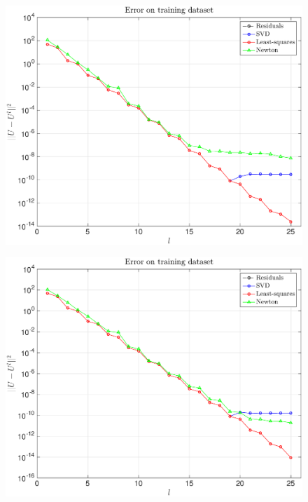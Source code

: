 \documentclass[11pt,a4paper]{article}
\theoremstyle{definition}
\theoremstyle{theorem}
\numberwithin{equation}{section}
\begin{document}
	\begin{figure}[H]
		\center
		\includegraphics[scale = 0.5]{fig18}
		\caption{}
	\end{figure}
	
	\begin{figure}[H]
		\center
		\includegraphics[scale = 0.5]{fig19}
		\caption{}
	\end{figure}
	
\end{document}

